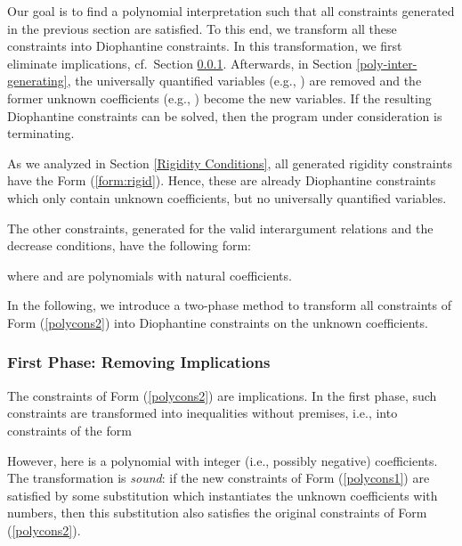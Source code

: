 \documentclass[envcountsame]{tlp}
\newcounter{polycons2ctr}
\newcounter{auxctr}
\newcounter{polycons1ctr}
\begin{document}
Our goal is to find a polynomial interpretation such that all
constraints generated in the previous section are satisfied. To this
end, we transform all these constraints into Diophantine
constraints. In this transformation, we first eliminate
implications, cf.\ Section \ref{First Phase}. Afterwards, in Section \ref{poly-inter-generating},  
the universally quantified variables
(e.g., ) are removed
and the former unknown
coefficients (e.g., )
become the new variables. If the resulting
Diophantine constraints can be solved, then the program under consideration is
terminating.

As we analyzed in Section \ref{Rigidity Conditions}, all generated rigidity
constraints have the Form (\ref{form:rigid}). Hence, these are already Diophantine
constraints which only contain unknown coefficients, but no universally
quantified variables. 

The other 
constraints, generated for the
valid interargument relations and the decrease conditions, have the following
form:
\setcounter{auxctr}{\value{equation}}
\setcounter{equation}{\value{polycons2ctr}}
 
where  and  are polynomials with natural
coefficients.
\setcounter{equation}{\value{auxctr}}

In the following, we introduce a two-phase method to transform
all constraints of Form (\ref{polycons2}) into
Diophantine constraints on the unknown coefficients. 


\subsubsection{First Phase: Removing Implications}\label{First Phase}\hspace*{\fill}

\vspace*{.2cm}

\noindent
The constraints of Form (\ref{polycons2}) are implications. In the first
phase, such constraints are transformed into inequalities without premises,
i.e., into constraints of the form
\setcounter{polycons1ctr}{\value{equation}}
 
However, here  is a polynomial with integer (i.e., possibly negative)
coefficients. The transformation is \emph{sound}:
if the new constraints of Form
(\ref{polycons1}) are satisfied by some
substitution which instantiates the unknown coefficients with numbers, 
then this substitution also satisfies the
original constraints of Form (\ref{polycons2}).
\end{document}
